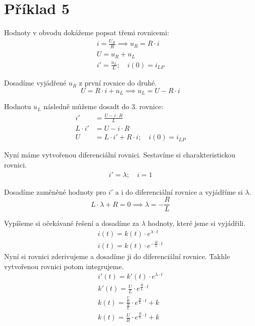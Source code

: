 

\section{Příklad 5}


Hodnoty v obvodu dokážeme popsat třemi rovnicemi:
\nopagebreak
\[
\begin{array}{l}
i = \frac{U_R}{R} \implies u_R = R \cdot i\\
U = u_R + u_L \\
i' = \frac{u_L}{L}; \quad i(0) = i_{LP}
\end{array}
\]

Dosadíme vyjádřené \( u_R \) z první rovnice do druhé.
\nopagebreak
\[
U = R \cdot i + u_L \implies u_L = U - R \cdot i
\]

Hodnotu \( u_L \) následně můžeme dosadt do 3. rovnice:
\nopagebreak
\[
\begin{aligned}
i' &= \frac{U - i \cdot R}{L} \\
L \cdot i' &= U - i \cdot R \\
U &= L \cdot i' + R \cdot i; \quad i(0) = i_{LP}
\end{aligned}
\]

Nyní máme vytvořenou diferenciální rovnici.
Sestavíme si charakteristickou rovnici.
\nopagebreak
\[
\begin{array}{l}
i' = \lambda; \quad
i = 1
\end{array}
\]

Dosadíme zaměněné hodnoty pro \( i' \) a i do diferenciální rovnice a vyjádříme si \( \lambda \).
\nopagebreak
\[
L \cdot \lambda + R = 0 \implies \lambda = -\frac{R}{L}
\]

Vypíšeme si očekávané řešení a dosadíme za \( \lambda \) hodnoty, které jsme si vyjádřili.
\nopagebreak
\[
\begin{array}{l}
i(t) = k(t) \cdot e^{\lambda \cdot t} \\
i(t) = k(t) \cdot e^{-\frac{R}{L} \cdot t}
\end{array}
\]
\newpage
Nyní si rovnici zderivujeme a dosadíme ji do diferenciální rovnice. Takhle vytvořenou rovnici potom integrujeme.
\nopagebreak
\[
\renewcommand{\arraystretch}{1.5}
\begin{array}{l}
i'(t) = k'(t) \cdot e^{\lambda \cdot t} \\
k'(t) = \frac{U}{L} \cdot e^{\frac{R}{L} \cdot t} \\
k(t) = \frac{\frac{U}{L}}{\frac{R}{L}} \cdot e^{\frac{R}{L} \cdot t} + k \\
k(t) = \frac{U}{R} \cdot e^{\frac{R}{L} \cdot t} + k
\end{array}
\]

